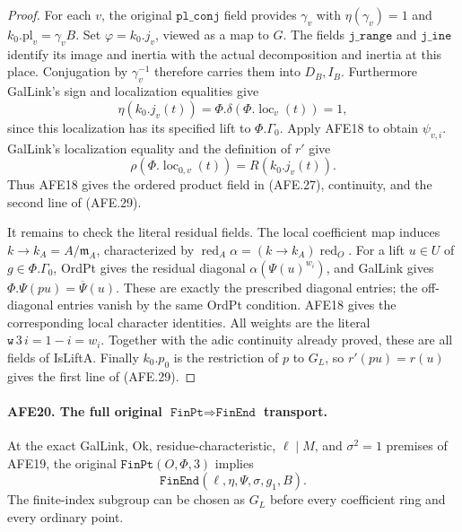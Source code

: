 \begin{proof}
For each \(v\), the original
\(\texttt{pl\_conj}\) field provides \(\gamma_v\)
with \(\eta(\gamma_v)=1\) and
\(k_0.\mathrm{pl}_v=\gamma_v B\).
Set \(\varphi=k_0.j_v\), viewed as a map to \(G\).
The fields \(\texttt{j\_range}\) and \(\texttt{j\_ine}\)
identify its image and inertia with the actual
decomposition and inertia at this place.
Conjugation by \(\gamma_v^{-1}\) therefore carries
them into \(D_B,I_B\).
Furthermore GalLink's sign and localization equalities
give
\[
           \eta(k_0.j_v(t))
             =\Phi.\delta(\Phi.\operatorname{loc}_v(t))=1,
 \]
since this localization has its specified lift to
\(\Phi.\Gamma_0\).
Apply AFE18 to obtain \(\psi_{v,i}\).
GalLink's localization equality and the definition of
\(r'\) give
\[
          \rho(\Phi.\operatorname{loc}_{0,v}(t))
                           =R(k_0.j_v(t)).
 \]
Thus AFE18 gives the ordered product field in
(AFE.27), continuity, and the second line of (AFE.29).

It remains to check the literal residual fields.
The local coefficient map induces
\(k\to k_A=A/\mathfrak m_A\), characterized by
\(\operatorname{red}_A\alpha=
 (k\to k_A)\operatorname{red}_O\).
For a lift \(u\in U\) of \(g\in\Phi.\Gamma_0\),
OrdPt gives the residual diagonal
\(\alpha(\Psi(u)^{w_i})\), and GalLink gives
\(\Phi.\Psi(pu)=\overline\Psi(u)\).
These are exactly the prescribed diagonal entries;
the off-diagonal entries vanish by the same OrdPt
condition.  AFE18 gives the corresponding local
character identities.  All weights are the literal
\(\texttt{w}\,3\,i=1-i=w_i\).
Together with the adic continuity already proved,
these are all fields of IsLiftA.
Finally \(k_0.p_0\) is the restriction of \(p\)
to \(G_L\), so \(r'(pu)=r(u)\) gives the first
line of (AFE.29).
\end{proof}

\paragraph{AFE20. The full original \(\texttt{FinPt}\Rightarrow\texttt{FinEnd}\) transport.}
\label{claim:AFE20}
At the exact GalLink, Ok, residue-characteristic,
\(\ell\mid M\), and \(\sigma^2=1\) premises of
AFE19, the original \(\texttt{FinPt}(O,\Phi,3)\)
implies
\[
                    \texttt{FinEnd}(\ell,\eta,\Psi,\sigma,g_1,B).
                                                        \tag{AFE.31}
\]
The finite-index subgroup can be chosen as
\(G_L\) before every coefficient ring and every
ordinary point.

